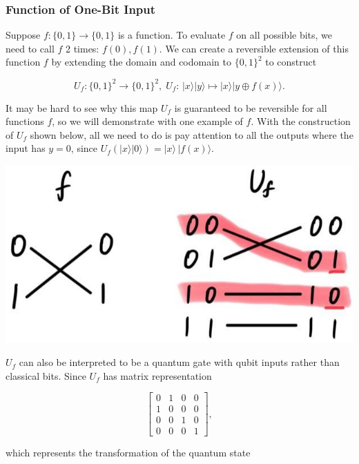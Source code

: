 \documentclass{article}
\theoremstyle{definition}
\begin{document}
    \subsubsection{Function of One-Bit Input}

      Suppose $f: \{0, 1\} \longrightarrow \{0, 1\}$ is a function. To evaluate $f$ on all possible bits, we need to call $f$ 2 times: $f(0), f(1)$. We can create a reversible extension of this function $f$ by extending the domain and codomain to $\{0, 1\}^2$ to construct

        \[U_f: \{0, 1\}^2 \longrightarrow \{0, 1\}^2, \; U_f: \, |x \rangle |y\rangle \mapsto |x\rangle |y \oplus f(x) \rangle.\]

      It may be hard to see why this map $U_f$ is guaranteed to be reversible for all functions $f$, so we will demonstrate with one example of $f$. With the construction of $U_f$ shown below, all we need to do is pay attention to all the outputs where the input has $y=0$, since $U_f (|x \rangle |0\rangle) = |x \rangle \, |f(x) \rangle$.

      \begin{center}
        \includegraphics[scale=0.3]{img/f_to_U_one_qubit_reversible.jpg}
      \end{center}

      $U_f$ can also be interpreted to be a quantum gate with qubit inputs rather than classical bits. Since $U_f$ has matrix representation

        \[\begin{bmatrix} 0&1&0&0\\ 1&0&0&0\\ 0&0&1&0\\ 0&0&0&1 \end{bmatrix},\]

      which represents the transformation of the quantum state
\end{document}
